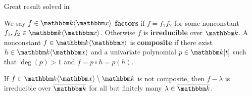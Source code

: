 
\noindent Great result solved in \cite{Vol19}


We say $f\in \bbk\fralg{\bbx}$ \textbf{factors} if $f = f_1f_2$ for some nonconstant $f_1,f_2\in \bbk\fralg{\bbx}$. Otherwise $f$ is \textbf{irreducible} over $\bbk$.
A nonconstant $f\in \bbk\fralg{\bbx}$ is \textbf{composite} if there exist $h\in \bbk\fralg{\bbx}$ and a univariate polynomial $p\in \bbk[t]$ such that $\deg(p)>1$ and $f = p\circ h = p(h)$.


\begin{theorem}
	If $f\in \bbk\fralg{\bbx}\setminus \bbk$ is not composite, then $f - \lambda$ is irreducible over $\overline{\bbk}$ for all but finitely many $\lambda\in\overline{\bbk}$.
\end{theorem}






